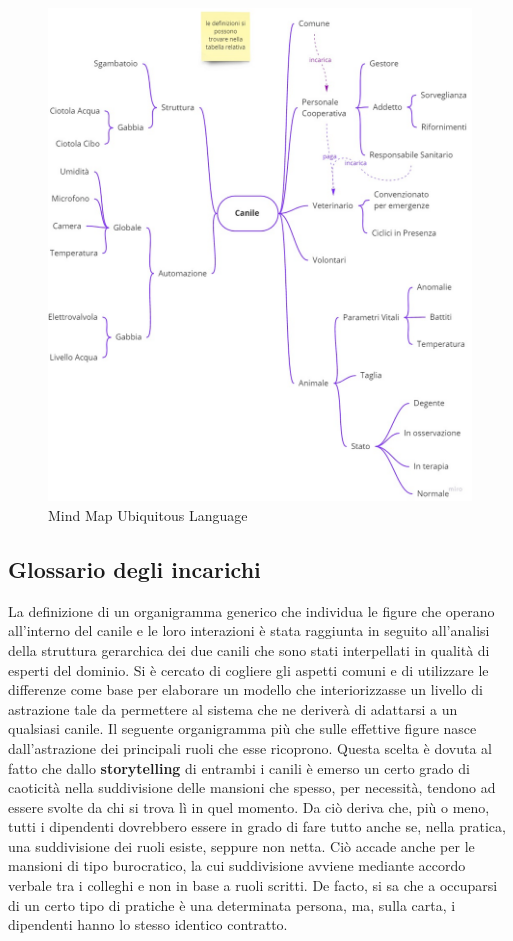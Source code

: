     
    \begin{figure}[ht]
        \caption{Mind Map Ubiquitous Language}
        \centering
        \includegraphics[width=1\textwidth]{Miro/MindMapUL.jpg}
    \end{figure}
    
    \subsection{Glossario degli incarichi}

        La definizione di un organigramma generico che individua le figure che operano all'interno del canile e le loro interazioni è stata raggiunta in seguito all'analisi della struttura gerarchica dei due canili che sono stati interpellati in qualità di esperti del dominio. Si è cercato di cogliere gli aspetti comuni e di utilizzare le differenze come base per elaborare un modello che interiorizzasse un livello di astrazione tale da permettere al sistema che ne deriverà di adattarsi a un qualsiasi canile. Il seguente organigramma più che sulle effettive figure nasce dall'astrazione dei principali ruoli che esse ricoprono. Questa scelta è dovuta al fatto che dallo \textbf{storytelling} di entrambi i canili è emerso un certo grado di caoticità nella suddivisione delle mansioni che spesso, per necessità, tendono ad essere svolte da chi si trova lì in quel momento. Da ciò deriva che, più o meno, tutti i dipendenti dovrebbero essere in grado di fare tutto anche se, nella pratica, una suddivisione dei ruoli esiste, seppure non netta. Ciò accade anche per le mansioni di tipo burocratico, la cui suddivisione avviene mediante accordo verbale tra i colleghi e non in base a ruoli scritti. De facto, si sa che a occuparsi di un certo tipo di pratiche è una determinata persona, ma, sulla carta, i dipendenti hanno lo stesso identico contratto.
        
